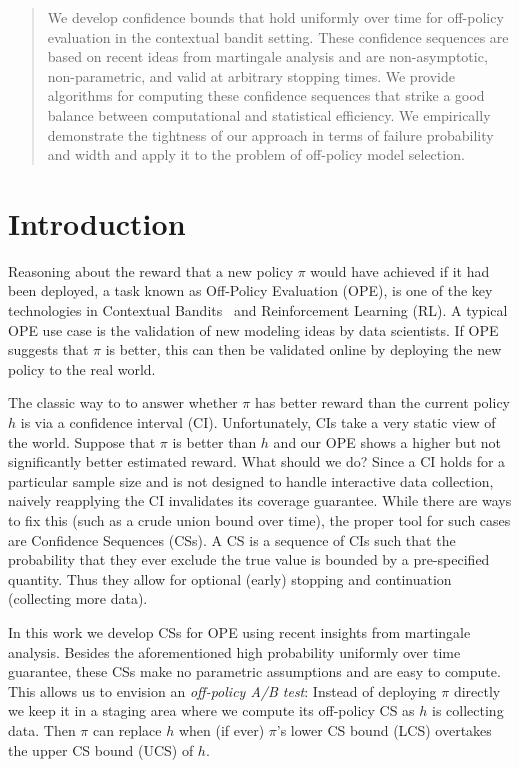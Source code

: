 \begin{abstract}
We develop confidence bounds that hold uniformly over time 
for off-policy evaluation in the contextual bandit
setting. These confidence sequences are based 
on recent ideas from martingale analysis and
are non-asymptotic, non-parametric, and valid 
at arbitrary stopping times. 
We provide algorithms for computing these 
confidence sequences that strike a 
good balance between computational and
statistical efficiency.
We empirically demonstrate the tightness
of our approach
in terms of failure probability and 
width and apply it to the problem of
off-policy model selection.
\end{abstract}

\section{Introduction}
Reasoning about the reward that 
a new policy $\pi$ would have achieved if it had been
deployed, a task known as Off-Policy Evaluation (OPE),
is one of the key technologies in Contextual
Bandits~\cite{epochgreedy} and Reinforcement Learning (RL).
A typical OPE use case is the validation of new modeling ideas
by data scientists. If OPE suggests that 
$\pi$ is better, this can then be validated 
online by deploying the new policy to the real world.

The classic way to to answer whether $\pi$ has better 
reward than the current policy $h$ is via a
confidence interval (CI).
Unfortunately, CIs take a very static view of the world.
Suppose that $\pi$ is better than $h$ 
and our OPE shows a higher but not significantly better 
estimated reward. What should we do? Since a CI holds for a
particular sample size and is not designed to handle 
interactive data collection, naively reapplying the CI
invalidates its coverage guarantee. While there are ways
to fix this (such as a crude union bound over time), 
the proper tool for such cases
are Confidence Sequences (CSs). A CS is a sequence 
of CIs such that the probability that they ever exclude 
the true value is bounded by a pre-specified quantity. 
Thus they allow for
optional (early) stopping and continuation 
(collecting more data).

In this work we develop CSs for OPE using 
recent insights from martingale analysis. 
Besides the aforementioned high probability
uniformly over time guarantee, these CSs make no parametric 
assumptions and are easy to compute. This
allows us to envision an \emph{off-policy A/B test}:
Instead of deploying $\pi$ directly 
we keep it in a staging area where 
we compute its off-policy CS as $h$ is collecting data.
Then $\pi$ can replace $h$ when (if ever)
$\pi$'s lower CS bound (LCS) 
overtakes the upper CS bound (UCS) of $h$.

